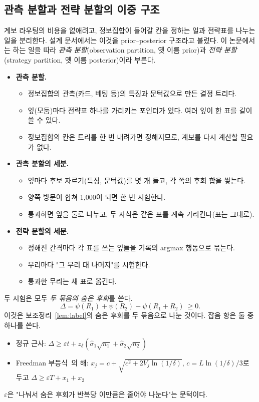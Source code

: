\subsection{관측 분할과 전략 분할의 이중 구조}\label{sec:derived-pp}
계보 라우팅의 비용을 없애려고, 정보집합이 들어갈 칸을 정하는 일과 전략표를 나누는 일을 분리한다.
설계 문서에서는 이것을 prior–posterior 구조라고 불렀다. 이 논문에서는 하는 일을 따라 \emph{관측 분할}(observation partition, 옛 이름 prior)과 \emph{전략 분할}(strategy partition, 옛 이름 posterior)이라 부른다.
\begin{itemize}
  \item \textbf{관측 분할.}
    \begin{itemize}
      \item 정보집합의 관측(카드, 베팅 등)의 특징과 문턱값으로 만든 결정 트리다.
      \item 잎(모둠)마다 전략표 하나를 가리키는 포인터가 있다. 여러 잎이 한 표를 같이 쓸 수 있다.
      \item 정보집합의 칸은 트리를 한 번 내려가면 정해지므로, 계보를 다시 계산할 필요가 없다.
    \end{itemize}
  \item \textbf{관측 분할의 세분.}
    \begin{itemize}
      \item 잎마다 후보 자르기(특징, 문턱값)를 몇 개 들고, 각 쪽의 후회 합을 쌓는다.
      \item 양쪽 방문이 합쳐 1,000이 되면 한 번 시험한다.
      \item 통과하면 잎을 둘로 나누고, 두 자식은 같은 표를 계속 가리킨다(표는 그대로).
    \end{itemize}
  \item \textbf{전략 분할의 세분.}
    \begin{itemize}
      \item 정해진 간격마다 각 표를 쓰는 잎들을 기록의 argmax 행동으로 묶는다.
      \item 무리마다 "그 무리 대 나머지"를 시험한다.
      \item 통과한 무리는 새 표로 옮긴다.
    \end{itemize}
\end{itemize}
두 시험은 모두 \emph{두 묶음의 숨은 후회}를 쓴다.
\[
\Delta=\psi(R_1)+\psi(R_2)-\psi(R_1+R_2)\ \ge0.
\]
이것은 보조정리~\ref{lem:label}의 숨은 후회를 두 묶음으로 나눈 것이다. 잡음 항은 둘 중 하나를 쓴다.
\begin{itemize}
  \item 정규 근사: $\Delta\ge\varepsilon t+z_\delta(\hat\sigma_1\sqrt{n_1}+\hat\sigma_2\sqrt{n_2})$
  \item Freedman 부등식~\citep{freedman1975tail}의 해: $x_j=c+\sqrt{c^2+2V_j\ln(1/\delta)}$, $c=L\ln(1/\delta)/3$로 두고 $\Delta\ge\varepsilon T+x_1+x_2$
\end{itemize}
$\varepsilon$은 "나눠서 숨은 후회가 반복당 이만큼은 줄어야 나눈다"는 문턱이다.

